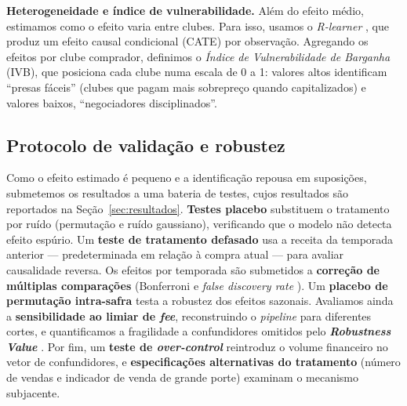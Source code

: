 \textbf{Heterogeneidade e índice de vulnerabilidade.} Além do efeito médio, estimamos como o efeito
varia entre clubes. Para isso, usamos o \textit{R-learner} \cite{nie2021}, que produz um efeito
causal condicional (CATE) por observação. Agregando os efeitos por clube comprador, definimos o
\textit{Índice de Vulnerabilidade de Barganha} (IVB), que posiciona cada clube numa escala de 0 a 1:
valores altos identificam ``presas fáceis'' (clubes que pagam mais sobrepreço quando capitalizados)
e valores baixos, ``negociadores disciplinados''.

\subsection{Protocolo de validação e robustez}

Como o efeito estimado é pequeno e a identificação repousa em suposições, submetemos os resultados a
uma bateria de testes, cujos resultados são reportados na Seção~\ref{sec:resultados}. \textbf{Testes
placebo} substituem o tratamento por ruído (permutação e ruído gaussiano), verificando que o modelo
não detecta efeito espúrio. Um \textbf{teste de tratamento defasado} usa a receita da temporada
anterior — predeterminada em relação à compra atual — para avaliar causalidade reversa. Os efeitos
por temporada são submetidos a \textbf{correção de múltiplas comparações} (Bonferroni e
\textit{false discovery rate} \cite{benjamini1995}). Um \textbf{placebo de permutação intra-safra}
testa a robustez dos efeitos sazonais. Avaliamos ainda a \textbf{sensibilidade ao limiar de
\textit{fee}}, reconstruindo o \textit{pipeline} para diferentes cortes, e quantificamos a
fragilidade a confundidores omitidos pelo \textbf{\textit{Robustness Value}} \cite{cinelli2020}.
Por fim, um \textbf{teste de \textit{over-control}} reintroduz o volume financeiro no vetor de
confundidores, e \textbf{especificações alternativas do tratamento} (número de vendas e indicador de
venda de grande porte) examinam o mecanismo subjacente.
